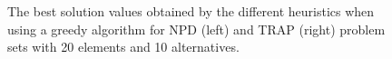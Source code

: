 \documentclass[runningheads]{llncs}
\begin{document}
\begin{figure}[H]
		\caption{\small{The best solution values obtained by the different heuristics when using a greedy algorithm for {{NPD}} (left) and {{TRAP}} (right) problem sets with 20 elements and 10 alternatives.\label{benchmarks}}}
	\end{figure}
	
	
	
	
	
\end{document}
